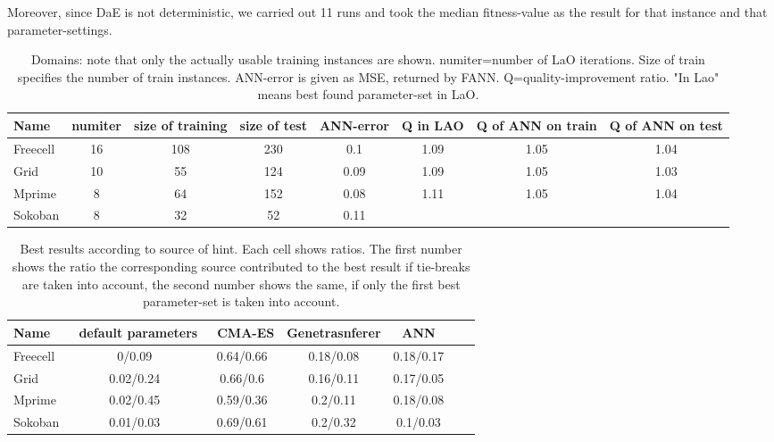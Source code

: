 \documentclass{acm_proc_article-sp}
\begin{document}
Moreover, since DaE is not deterministic, we carried out 11 runs and took the median fitness-value as the result for that instance and that parameter-settings.

\begin{table*}[ht]
\centering
\begin{tabular}{l c c c c c c c}
\hline\hline
Name & numiter & size of training & size of test &  ANN-error & Q in LAO & Q of ANN on train & Q of ANN on test \\ 
\hline
Freecell& 16 & 108 & 230 & 0.1 & 1.09 & 1.05 & 1.04  \\
Grid & 10 & 55 & 124 & 0.09 & 1.09 & 1.05 & 1.03  \\
Mprime & 8 & 64 & 152 & 0.08 & 1.11 & 1.05 & 1.04   \\
Sokoban & 8 & 32 & 52 & 0.11 & 	 &  &   \\
\hline
\end{tabular}
\caption{Domains: note that only the actually usable training instances are shown. numiter=number of LaO iterations. Size of train specifies the number of train instances. ANN-error is given as MSE, returned by FANN. Q=quality-improvement ratio. "In Lao" means best found parameter-set in LaO.}
\label{table:domains}
\end{table*} 

 \begin{table*}[ht]
\centering
\begin{tabular}{l c c c c c c}
\hline\hline
Name & \ default parameters & \ CMA-ES &  Genetrasnferer & ANN \\ 
\hline
Freecell & 0/0.09& 0.64/0.66  & 0.18/0.08  & 0.18/0.17     \\
Grid & 0.02/0.24 & 0.66/0.6  & 0.16/0.11 & 0.17/0.05  &    \\
Mprime &  0.02/0.45& 0.59/0.36 & 0.2/0.11  & 0.18/0.08  &    \\
Sokoban & 0.01/0.03 & 0.69/0.61   & 0.2/0.32  & 0.1/0.03  &    \\
\hline
\end{tabular}
\caption{Best results according to source of hint. Each cell shows ratios. The first number shows the ratio the corresponding source contributed to the best result if tie-breaks are taken into account, the second number shows the same, if only the first best parameter-set is taken into account.}
\label{table:hints}
\end{table*} 
\end{document}
